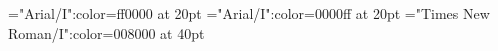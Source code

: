 \documentclass[a4paper]{article}
\begin{document}
 
\pagestyle{plain} 
\sloppy 
\setlength{\parfillskip}{0pt plus 1fil} 
\font\ta="Arial/I":color=ff0000 at 20pt
\font\tbta="Arial/I":color=0000ff at 20pt
\font\tctbta="Times New Roman/I":color=008000 at 40pt

\pagestyle{fancy} 





\end{document}
